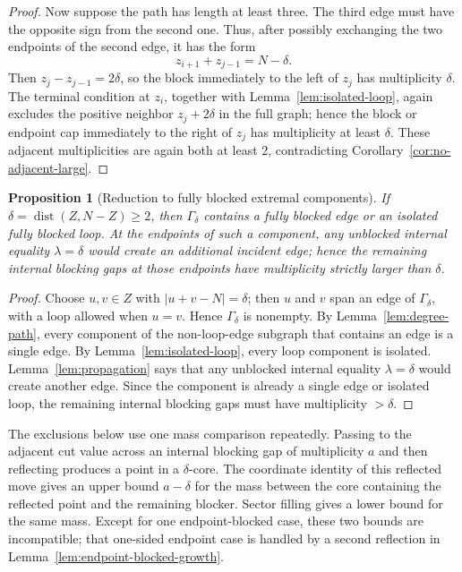 \documentclass[11pt]{article}
\newtheorem{proposition}[theorem]{Proposition}
\newcommand{\dist}{\operatorname{dist}}
\begin{document}
\begin{proof}
Now suppose the path has length at least three.  The third edge must have the opposite sign from the second one.  Thus, after possibly exchanging the two endpoints of the second edge, it has the form
\[
        z_{i+1}+z_{j-1}=N-\delta .
\]
Then $z_j-z_{j-1}=2\delta$, so the block immediately to the left of $z_j$ has multiplicity $\delta$.  The terminal condition at $z_i$, together with Lemma~\ref{lem:isolated-loop}, again excludes the positive neighbor $z_j+2\delta$ in the full graph; hence the block or endpoint cap immediately to the right of $z_j$ has multiplicity at least $\delta$.  These adjacent multiplicities are again both at least $2$, contradicting Corollary~\ref{cor:no-adjacent-large}.
\end{proof}

\begin{proposition}[Reduction to fully blocked extremal components]\label{prop:sealed-reduction}
If $\delta=\dist(Z,N-Z)\ge2$, then $\Gamma_\delta$ contains a fully blocked edge or an isolated fully blocked loop.  At the endpoints of such a component, any unblocked internal equality $\lambda=\delta$ would create an additional incident edge; hence the remaining internal blocking gaps at those endpoints have multiplicity strictly larger than $\delta$.
\end{proposition}

\begin{proof}
Choose $u,v\in Z$ with $|u+v-N|=\delta$; then $u$ and $v$ span an edge of $\Gamma_\delta$, with a loop allowed when $u=v$.  Hence $\Gamma_\delta$ is nonempty.  By Lemma~\ref{lem:degree-path}, every component of the non-loop-edge subgraph that contains an edge is a single edge.  By Lemma~\ref{lem:isolated-loop}, every loop component is isolated.  Lemma~\ref{lem:propagation} says that any unblocked internal equality $\lambda=\delta$ would create another edge.  Since the component is already a single edge or isolated loop, the remaining internal blocking gaps must have multiplicity $>\delta$.
\end{proof}

The exclusions below use one mass comparison repeatedly.  Passing to the adjacent cut value across an internal blocking gap of multiplicity $a$ and then reflecting produces a point in a $\delta$-core.  The coordinate identity of this reflected move gives an upper bound $a-\delta$ for the mass between the core containing the reflected point and the remaining blocker.  Sector filling gives a lower bound for the same mass.  Except for one endpoint-blocked case, these two bounds are incompatible; that one-sided endpoint case is handled by a second reflection in Lemma~\ref{lem:endpoint-blocked-growth}.
\end{document}
